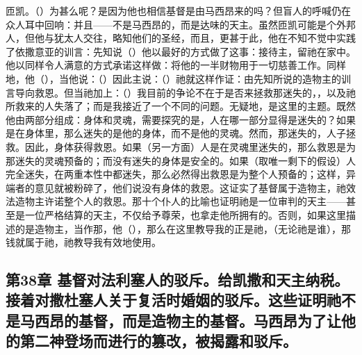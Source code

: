 匝凯。（\newline{}）为甚么呢？是因为他也相信基督是由马西昂来的吗？但盲人的呼喊仍在众人耳中回响：并且——不是马西昂的，而是达味的天主。虽然匝凯可能是个外邦人，但他与犹太人交往，略知他们的圣经，而且，更甚于此，他在不知不觉中实践了依撒意亚的训言：先知说（\newline{}）他以最好的方式做了这事：接待主，留祂在家中。他以同样令人满意的方式承诺这样做：将他的一半财物用于一切慈善工作。同样地，他（\newline{}），当他说：（\newline{}）因此主说：（\newline{}）祂就这样作证：由先知所说的造物主的训言导向救恩。但当祂加上：（\newline{}）我目前的争论不在于是否来拯救那迷失的，，以及祂所救来的人失落了；而是我接近了一个不同的问题。无疑地，是这里的主题。既然他由两部分组成：身体和灵魂，需要探究的是，人在哪一部分显得是迷失的？如果是在身体里，那么迷失的是他的身体，而不是他的灵魂。然而，那迷失的，人子拯救。因此，身体获得救恩。如果（另一方面）人是在灵魂里迷失的，那么救恩是为那迷失的灵魂预备的；而没有迷失的身体是安全的。如果（取唯一剩下的假设）人完全迷失，在两重本性中都迷失，那么必然得出救恩是为整个人预备的；这样，异端者的意见就被粉碎了，他们说没有身体的救恩。这证实了基督属于造物主，祂效法造物主许诺整个人的救恩。那十个仆人的比喻也证明祂是一位审判的天主——甚至是一位严格结算的天主，不仅给予尊荣，也拿走他所拥有的。否则，如果这里描述的是造物主，当作那，他（\newline{}），那么在这里教导我的正是祂，（无论祂是谁），那钱就属于祂，祂教导我有效地使用。\par


\subsection{第38章 基督对法利塞人的驳斥。给凯撒和天主纳税。接着对撒杜塞人关于复活时婚姻的驳斥。这些证明祂不是马西昂的基督，而是造物主的基督。马西昂为了让他的第二神登场而进行的篡改，被揭露和驳斥。}

